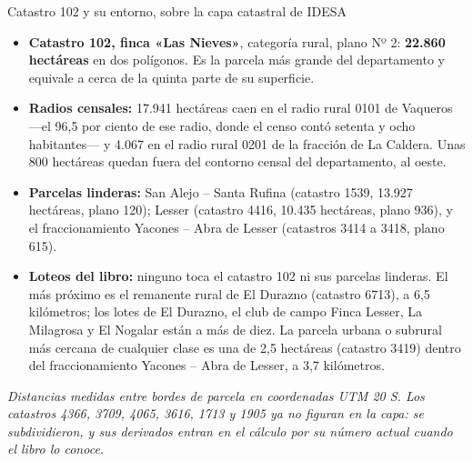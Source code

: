 \begin{ficha}{Catastro 102 y su entorno, sobre la capa catastral de IDESA}
\begin{itemize}[leftmargin=*,nosep]
\item \textbf{Catastro 102, finca «Las Nieves»}, categoría rural, plano Nº 2: \textbf{22.860 hectáreas} en dos polígonos. Es la parcela más grande del departamento y equivale a cerca de la quinta parte de su superficie.
\item \textbf{Radios censales:} 17.941 hectáreas caen en el radio rural 0101 de Vaqueros ---el 96,5 por ciento de ese radio, donde el censo contó setenta y ocho habitantes--- y 4.067 en el radio rural 0201 de la fracción de La Caldera. Unas 800 hectáreas quedan fuera del contorno censal del departamento, al oeste.
\item \textbf{Parcelas linderas:} San Alejo -- Santa Rufina (catastro 1539, 13.927 hectáreas, plano 120); Lesser (catastro 4416, 10.435 hectáreas, plano 936), y el fraccionamiento Yacones -- Abra de Lesser (catastros 3414 a 3418, plano 615).
\item \textbf{Loteos del libro:} ninguno toca el catastro 102 ni sus parcelas linderas. El más próximo es el remanente rural de El Durazno (catastro 6713), a 6,5 kilómetros; los lotes de El Durazno, el club de campo Finca Lesser, La Milagrosa y El Nogalar están a más de diez. La parcela urbana o subrural más cercana de cualquier clase es una de 2,5 hectáreas (catastro 3419) dentro del fraccionamiento Yacones -- Abra de Lesser, a 3,7 kilómetros.
\end{itemize}
\textit{Distancias medidas entre bordes de parcela en coordenadas UTM 20 S. Los catastros 4366, 3709, 4065, 3616, 1713 y 1905 ya no figuran en la capa: se subdividieron, y sus derivados entran en el cálculo por su número actual cuando el libro lo conoce.}
\end{ficha}

